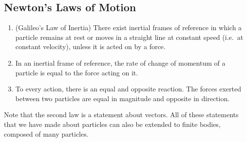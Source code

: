 \subsection{Newton's Laws of Motion}
\begin{enumerate}
	\item (Galileo's Law of Inertia) There exist inertial frames of reference in which a particle remains at rest or moves in a straight line at constant speed (i.e.\ at constant velocity), unless it is acted on by a force.
	\item In an inertial frame of reference, the rate of change of momentum of a particle is equal to the force acting on it.
	\item To every action, there is an equal and opposite reaction. The forces exerted between two particles are equal in magnitude and opposite in direction.
\end{enumerate}
Note that the second law is a statement about vectors. All of these statements that we have made about particles can also be extended to finite bodies, composed of many particles.

